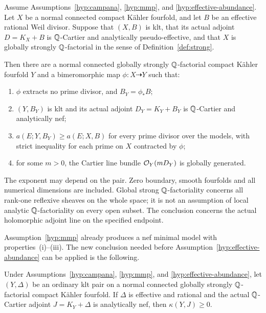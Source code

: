 \begin{theorem}\label{thm:main}
Assume Assumptions~\ref{hyp:campana}, \ref{hyp:mmp}, and
\ref{hyp:effective-abundance}. Let \(X\) be a normal connected
compact K\"ahler fourfold, and let \(B\) be an effective rational
Weil divisor. Suppose that \((X,B)\) is klt, that its actual adjoint
\(D=K_X+B\) is \(\mathbb{Q}\)-Cartier and analytically
pseudo-effective, and that \(X\) is globally strongly
\(\mathbb{Q}\)-factorial in the sense of Definition~\ref{def:strong}.

Then there are a normal connected globally strongly
\(\mathbb{Q}\)-factorial compact K\"ahler fourfold \(Y\) and a
bimeromorphic map \(\phi:X\dashrightarrow Y\) such that:
\begin{enumerate}[label=\textup{(\roman*)}]
\item \(\phi\) extracts no prime divisor, and
      \(B_Y=\phi_*B\);
\item \((Y,B_Y)\) is klt and its actual adjoint
      \(D_Y=K_Y+B_Y\) is \(\mathbb{Q}\)-Cartier and analytically nef;
\item \(a(E;Y,B_Y)\ge a(E;X,B)\) for every prime divisor over
      the models, with strict inequality for each prime on \(X\)
      contracted by \(\phi\);
\item for some \(m>0\), the Cartier line bundle
      \(\mathcal{O}_Y(mD_Y)\) is globally generated.
\end{enumerate}
\end{theorem}

The exponent may depend on the pair. Zero boundary, smooth fourfolds
and all numerical dimensions are included. Global strong
\(\mathbb{Q}\)-factoriality concerns all rank-one reflexive sheaves on
the whole space; it is not an assumption of local analytic
\(\mathbb{Q}\)-factoriality on every open subset. The conclusion concerns
the actual holomorphic adjoint line on the specified endpoint.

Assumption~\ref{hyp:mmp} already produces a nef minimal model with
properties~\textup{(i)}--\textup{(iii)}. The new conclusion needed
before Assumption~\ref{hyp:effective-abundance} can be applied is
the following.

\begin{theorem}
\label{thm:nonvanishing}
Under Assumptions~\ref{hyp:campana}, \ref{hyp:mmp}, and
\ref{hyp:effective-abundance}, let \((Y,\Delta)\) be an ordinary
klt pair on a normal connected globally strongly
\(\mathbb{Q}\)-factorial compact K\"ahler fourfold. If \(\Delta\)
is effective and rational and the actual \(\mathbb{Q}\)-Cartier adjoint
\(J=K_Y+\Delta\) is analytically nef, then
\(\kappa(Y,J)\ge0\).
\end{theorem}

